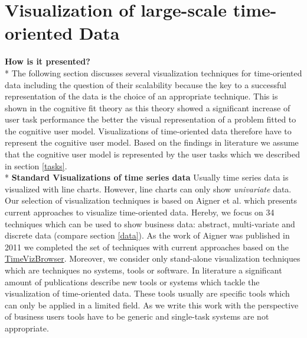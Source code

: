 \section{Visualization of large-scale time-oriented Data} \label{vis}
\textbf{How is it presented?}\\*
The following section discusses several visualization techniques for time-oriented data including the question of their scalability because the key to a successful representation of the data is the choice of an appropriate technique. This is shown in the cognitive fit theory\cite{Vessey1991} as this theory showed a significant increase of user task performance the better the visual representation of a problem fitted to the cognitive user model. Visualizations of time-oriented data therefore have to represent the cognitive user model. Based on the findings in literature we assume that the cognitive user model is represented by the user tasks which we described in section \ref{tasks}.\\* 
\textbf{Standard Visualizations of time series data}
Usually time series data is visualized with line charts. However, line charts can only show \textit{univariate} data. Our selection of visualization techniques is based on Aigner et al.\cite{Aigner2011} which presents current approaches to visualize time-oriented data. Hereby, we focus on 34 techniques which can be used to show business data: abstract, multi-variate and discrete data (compare section \ref{data}). 
As the work of Aigner was published in 2011 we completed the set of techniques with current approaches based on the \href{http://survey.timeviz.net/}{TimeVizBrowser}. Moreover, we consider only stand-alone visualization techniques which are techniques no systems, tools or software. In literature a significant amount of publications describe new tools or systems which tackle the visualization of time-oriented data. These tools usually are specific tools which can only be applied in a limited field. As we write this work with the perspective of business users tools have to be generic and single-task systems are not appropriate.

